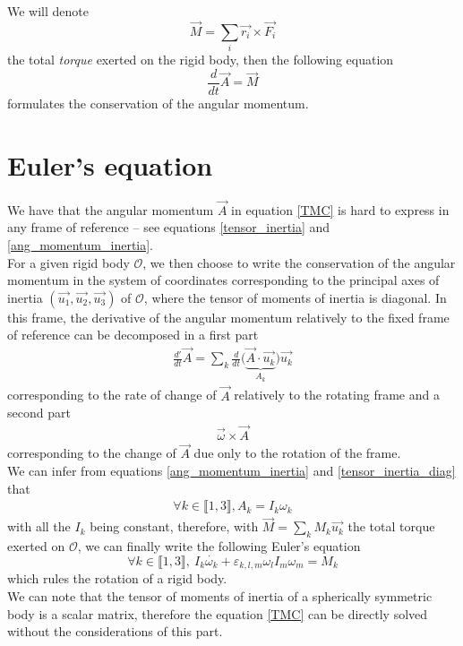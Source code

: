 \documentclass[class=report, float=false, crop=false]{standalone}
\begin{document}
We will denote
\begin{equation}
\vec{M} = \sum_i \vec{r_i}\times\vec{F_i}
\end{equation}
the total \textit{torque} exerted on the rigid body, then the following equation
\begin{equation}
\boxed{\frac{d}{dt} \vec{A} = \vec{M}}
\label{TMC}
\end{equation}
formulates the conservation of the angular momentum.

\section{Euler's equation}

We have that the angular momentum $\vec{A}$ in equation \ref{TMC} is hard to express in any frame of reference -- see equations \ref{tensor_inertia} and \ref{ang_momentum_inertia}.\\

For a given rigid body $\mathcal{O}$, we then choose to write the conservation of the angular momentum in the system of coordinates corresponding to the principal axes of inertia $(\vec{u_1},\vec{u_2},\vec{u_3})$ of $\mathcal{O}$, where the tensor of moments of inertia is diagonal. In this frame, the derivative of the angular momentum relatively to the fixed frame of reference can be decomposed in a first part
\begin{align*}
\frac{d'}{dt} \vec{A} = \sum_k \frac{d}{dt}\Big(\underbrace{\vec{A}\cdot\vec{u_k}}_{A_k}\Big)\vec{u_k}
\end{align*}
corresponding to the rate of change of $\vec{A}$ relatively to the rotating frame and a second part
\begin{align*}
\vec{\omega} \times \vec{A}
\end{align*}
corresponding to the change of $\vec{A}$ due only to the rotation of the frame.\\

We can infer from equations \ref{ang_momentum_inertia} and \ref{tensor_inertia_diag} that
\begin{align*}
\forall k \in \llbracket1,3\rrbracket, A_k = I_k \omega_k
\end{align*}
with all the $I_k$ being constant, therefore, with $\vec{M} = \sum_k M_k \vec{u_k}$ the total torque exerted on $\mathcal{O}$, we can finally write the following Euler's equation
\begin{equation}
\boxed{\forall k \in \llbracket1,3\rrbracket,~ I_k \dot{\omega_k} + \varepsilon_{k,l,m}\omega_lI_m\omega_m = M_k}
\label{euler_rot}
\end{equation}
which rules the rotation of a rigid body.\\

We can note that the tensor of moments of inertia of a spherically symmetric body is a scalar matrix, therefore the equation \ref{TMC} can be directly solved without the considerations of this part.

% 
\end{document}
